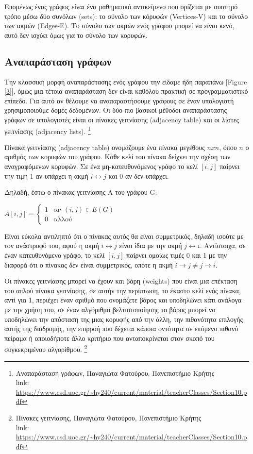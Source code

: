Επομένως ένας γράφος είναι ένα μαθηματικό αντικείμενο που ορίζεται με αυστηρό τρόπο μέσω δύο συνόλων (sets): το σύνολο των κόρυφών (Vertices-V) και το σύνολο των ακμών (Edges-E). Το σύνολο των ακμών ενός γράφου μπορεί να είναι κενό, αυτό δεν ισχύει όμως για το σύνολο των κορυφών. \cite{Gewrgiadis2017thewria}

\subsection{Αναπαράσταση γράφων}
Την κλασσική μορφή αναπαράστασης ενός γράφου την είδαμε ήδη παραπάνω [Figure \ref{3}], όμως μια τέτοια αναπαράσταση δεν είναι καθόλου πρακτική σε προγραμματιστικό επίπεδο. Για αυτό αν θέλουμε να αναπαραστήσουμε γράφους σε έναν υπολογιστή χρησιμοποιούμε δομές δεδομένων. Οι δύο πιο βασικοί μέθοδοι αναπαράστασης γράφων σε υπολογιστές είναι οι πίνακες γειτνίασης (adjacency table) και οι λίστες γειτνίασης (adjacency lists). \footnote{Αναπαράσταση γράφων, Παναγιώτα Φατούρου, Πανεπιστήμιο Κρήτης \\link: \url{https://www.csd.uoc.gr/~hy240/current/material/teacherClasses/Section10.pdf}}

Πίνακα γειτνίασης (adjacency table) ονομάζουμε ένα πίνακα μεγέθους $nxn$, όπου $n$ ο αριθμός των κορυφών του γράφου. Κάθε κελί του πίνακα δείχνει την σχέση των αναγραφόμενων κορυφών. Σε ένα μη-κατευθυνόμενος γράφο το κελί $[i, j]$ παίρνει την τιμή 1 αν υπάρχει η ακμή $i \longleftrightarrow j$ και 0 αν δεν υπάρχει. 

Δηλαδή, έστω ο πίνακας γειτνίασης A του γράφου G:
\begin{center}
    $A[i, j] = 
    \begin{cases}
      1 & \text{αν $(i,j) \in E(G)$}\\
      0 & \text{αλλού}
    \end{cases}$
\end{center}
Είναι εύκολα αντιληπτό ότι ο πίνακας αυτός θα είναι συμμετρικός, δηλαδή ισούτε με τον ανάστροφό του, αφού η ακμή $i \longleftrightarrow j$ είναι ίδια με την ακμή $j \longleftrightarrow i$. Αντίστοιχα, σε έναν κατευθυνόμενο γράφο, το κελί $[i, j]$ παίρνει ομοίως τιμές 0 και 1 με την διαφορά ότι ο πίνακας δεν είναι συμμετρικός, οπότε η ακμή $i \rightarrow j \neq j \rightarrow i$. 

Οι πίνακες γειτνίασης μπορεί να έχουν και βάρη (weights) που είναι μια επέκταση του απλού πίνακα γειτνίασης, σε αυτήν την περίπτωση, το έκαστο κελί ενός πίνακα, αντί για 1, περιέχει έναν αριθμό που ονομάζετε βάρος και υποδηλώνει κάτι ανάλογα με την χρήση του, σε έναν αλγόριθμο βελτιστοποίησης το βάρος μπορεί να υποδηλώνει την απόσταση της μιας κορυφής από την άλλη, την πιθανότητα επιλογής αυτής της διαδρομής, την επιρροή που δέχεται κάποια οντότητα σε επόμενο πιθανό πείραμα ή οποιοδήποτε άλλο κριτήριο που ανταποκρίνεται στον σκοπό του συγκεκριμένου αλγορίθμου.
\cite{gkertsis2023thewria}
\footnote{Πίνακες γειτνίασης, Παναγιώτα Φατούρου, Πανεπιστήμιο Κρήτης \\link: \url{https://www.csd.uoc.gr/~hy240/current/material/teacherClasses/Section10.pdf}}


